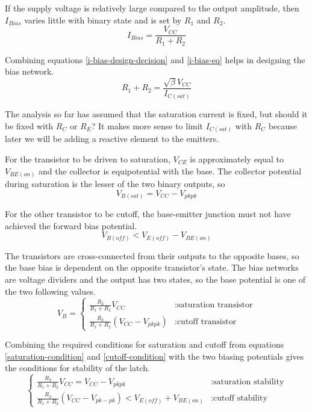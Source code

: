 \documentclass[titlepage, letterpaper, 10.5pt]{article}
\begin{document}
If the supply voltage is relatively large compared to the output amplitude,
then $I_{Bias}$ varies little with binary state and is set by $R_{1}$ and $R_{2}$.
\begin{equation}
I_{Bias}=\frac{V_{CC}}{R_{1}+R_{2}}
\label{i-bias-eq}
\end{equation}

Combining equations \ref{i-bias-design-decision} and \ref{i-bias-eq} helps in designing
the bias network.
\begin{equation}
R_{1}+R_{2}=\frac{\sqrt{\beta}V_{CC}}{I_{C(sat)}}
\label{r1r2-eq}
\end{equation}

The analysis so far has assumed that the saturation current is fixed,
but should it be fixed with $R_{C}$ or $R_{E}$?
It makes more sense to limit $I_{C(sat)}$ with $R_{C}$ because
later we will be adding a reactive element to the emitters.

For the transistor to be driven to saturation, $V_{CE}$ is approximately equal to $V_{BE(on)}$
and the collector is equipotential with the base. The collector potential
during saturation is the lesser of the two binary outputs, so
\begin{equation}
V_{B(sat)}=V_{CC}-V_{pkpk}
\label{saturation-condition}
\end{equation}

For the other transistor to be cutoff,
the base-emitter junction must not have achieved the forward bias potential.
\begin{equation}
V_{B(off)}<V_{E(off)}-V_{BE(on)}
\label{cutoff-condition}
\end{equation}

The transistors are cross-connected from their outputs to the opposite bases, so the base bias
is dependent on the opposite transistor's state. The bias networks are voltage dividers and the output
has two states, so the base potential is one of the two following values.
\begin{equation}
V_{B}=
\left\{
	\begin{array}{lr}
	\frac{R_{2}}{R_{1}+R_{2}}V_{CC}	& : \textrm{saturation transistor}	\\
	\frac{R_{2}}{R_{1}+R_{2}}(V_{CC}-V_{pkpk})	& : \textrm{cutoff transistor}
	\end{array}
\right.
\label{base-voltages}
\end{equation}

Combining the required conditions for saturation and cutoff from equations
\ref{saturation-condition} and \ref{cutoff-condition}
with the two biasing potentials gives the conditions for stability of the latch.
\begin{equation*}
\left\{
	\begin{array}{lr}
	\frac{R_{2}}{R_{1}+R_{2}}V_{CC}=V_{CC}-V_{pkpk}	& : \textrm{saturation stability}	\\
	\frac{R_{2}}{R_{1}+R_{2}}(V_{CC}-V_{pk-pk})<V_{E(off)}+V_{BE(on)}	& : \textrm{cutoff stability}
	\end{array}
\right.
\end{equation*}
\end{document}
